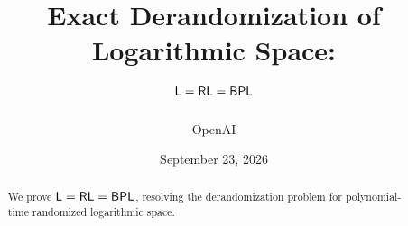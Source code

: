 \documentclass[11pt]{article}
\title{Exact Derandomization of Logarithmic Space:\protect\\
  $\mathsf L=\mathsf{RL}=\mathsf{BPL}$}
\author{OpenAI}
\date{September 23, 2026}
\begin{document}
\maketitle
\begin{abstract}
We prove $\mathsf L=\mathsf{RL}=\mathsf{BPL}$, resolving the derandomization problem for
polynomial-time randomized logarithmic space.
\end{abstract}

\tableofcontents
\clearpage
















\end{document}
